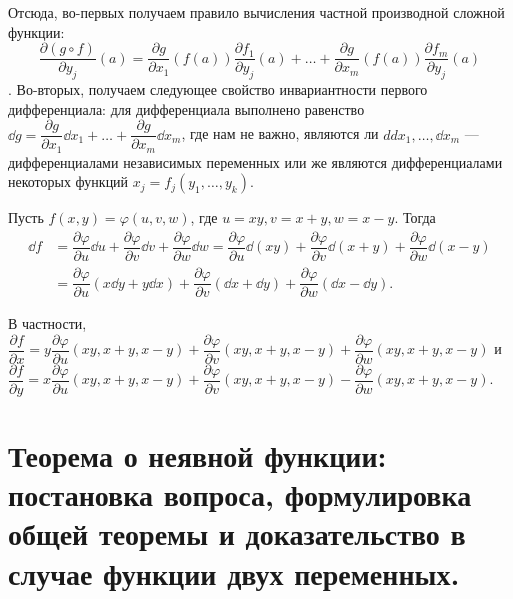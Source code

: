 \documentclass[a4paper]{article}
\theoremstyle{named}
\begin{document}
\begin{remark*}
        Отсюда, во-первых получаем правило вычисления частной производной сложной функции:
        $$\dfrac{\partial (g\circ f)}{\partial y_j}(a) =
        \dfrac{\partial g}{\partial x_1}(f(a)) \dfrac{\partial f_1}{\partial y_j}(a)+\ldots+
        \dfrac{\partial g}{\partial x_m}(f(a)) \dfrac{\partial f_m}{\partial y_j}(a)$$.
        Во-вторых, получаем следующее свойство инвариантности первого дифференциала:
        для дифференциала выполнено равенство
        $\dd g = \dfrac{\partial g}{\partial x_1}\dd x_1+\ldots+\dfrac{\partial g}{\partial x_m}\dd x_m$,
        где нам не важно, являются ли $
        dd x_1,\ldots, \dd x_m$ --- дифференциалами независимых переменных
        или же являются дифференциалами некоторых функций $x_j = f_j(y_1,\ldots, y_k)$.
    \end{remark*}

    \begin{example*}
        Пусть $f(x,y) = \varphi(u, v, w)$, где $u=xy, v= x+y, w=x-y$.
        Тогда
        \begin{align*}
            \dd f 
            &= \dfrac{\partial \varphi}{\partial u} \dd u + \dfrac{\partial \varphi}{\partial v} \dd v + \dfrac{\partial \varphi}{\partial w} \dd w 
            = \dfrac{\partial \varphi}{\partial u} \dd(xy) + \dfrac{\partial \varphi}{\partial v} \dd(x+y) + \dfrac{\partial \varphi}{\partial w} \dd(x-y) \\
            &= \dfrac{\partial \varphi}{\partial u} (x\dd y + y\dd x) +
            \dfrac{\partial \varphi}{\partial v} (\dd x+\dd y) + \dfrac{\partial \varphi}{\partial w} (\dd x - \dd y).
        \end{align*}

        В частности,
        $\dfrac{\partial f}{\partial x} = y\dfrac{\partial \varphi}{\partial u}(xy, x+y, x-y) +
        \dfrac{\partial \varphi}{\partial v}(xy, x+y, x-y) +  \dfrac{\partial \varphi}{\partial w}(xy, x+y, x-y)$
        и $\dfrac{\partial f}{\partial y} = x\dfrac{\partial \varphi}{\partial u}(xy, x+y, x-y) +
        \dfrac{\partial \varphi}{\partial v}(xy, x+y, x-y) -  \dfrac{\partial \varphi}{\partial w}(xy, x+y, x-y)$.
    \end{example*}

    \section{Теорема о неявной функции: постановка вопроса, формулировка общей теоремы и доказательство в случае функции двух переменных.}
\end{document}
